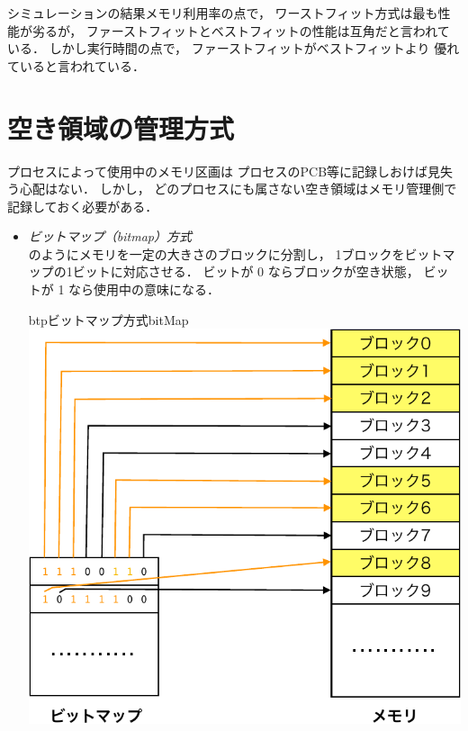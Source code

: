 シミュレーションの結果メモリ利用率の点で，
ワーストフィット方式は最も性能が劣るが，
ファーストフィットとベストフィットの性能は互角だと言われている．
しかし実行時間の点で，
ファーストフィットがベストフィットより
優れていると言われている\cite{MemoryAllocation}．

\section{空き領域の管理方式}
プロセスによって使用中のメモリ区画は
プロセスのPCB等に記録しおけば見失う心配はない．
しかし，
どのプロセスにも属さない空き領域はメモリ管理側で記録しておく必要がある．

\begin{itemize}
\item \emph{ビットマップ（bitmap）方式}\\
  のようにメモリを一定の大きさのブロックに分割し，
  1ブロックをビットマップの1ビットに対応させる．
  ビットが 0 ならブロックが空き状態，
  ビットが 1 なら使用中の意味になる．

  \begin{myfig}{btp}{ビットマップ方式}{bitMap}
    \includegraphics[scale=0.6]{Fig/bitMap-crop.pdf}
  \end{myfig}


\end{itemize}
